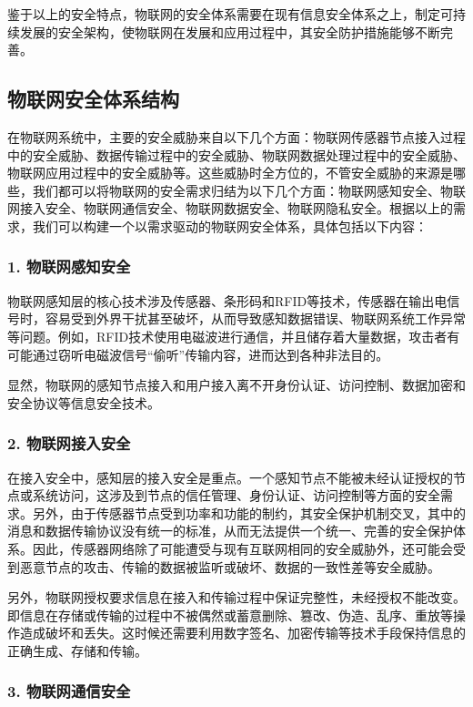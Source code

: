 鉴于以上的安全特点，物联网的安全体系需要在现有信息安全体系之上，制定可持续发展的安全架构，使物联网在发展和应用过程中，其安全防护措施能够不断完善。

\subsection{物联网安全体系结构}
\label{computer}

在物联网系统中，主要的安全威胁来自以下几个方面：物联网传感器节点接入过程中的安全威胁、数据传输过程中的安全威胁、物联网数据处理过程中的安全威胁、物联网应用过程中的安全威胁等。这些威胁时全方位的，不管安全威胁的来源是哪些，我们都可以将物联网的安全需求归结为以下几个方面：物联网感知安全、物联网接入安全、物联网通信安全、物联网数据安全、物联网隐私安全。根据以上的需求，我们可以构建一个以需求驱动的物联网安全体系，具体包括以下内容：
\subsubsection{\textcolor{myblue}{\textbf{1. 物联网感知安全 }}}

物联网感知层的核心技术涉及传感器、条形码和RFID等技术，传感器在输出电信号时，容易受到外界干扰甚至破坏，从而导致感知数据错误、物联网系统工作异常等问题。例如，RFID技术使用电磁波进行通信，并且储存着大量数据，攻击者有可能通过窃听电磁波信号“偷听”传输内容，进而达到各种非法目的。

显然，物联网的感知节点接入和用户接入离不开身份认证、访问控制、数据加密和安全协议等信息安全技术。

\subsubsection{\textcolor{myblue}{\textbf{2. 物联网接入安全 }}}

在接入安全中，感知层的接入安全是重点。一个感知节点不能被未经认证授权的节点或系统访问，这涉及到节点的信任管理、身份认证、访问控制等方面的安全需求。另外，由于传感器节点受到功率和功能的制约，其安全保护机制交叉，其中的消息和数据传输协议没有统一的标准，从而无法提供一个统一、完善的安全保护体系。因此，传感器网络除了可能遭受与现有互联网相同的安全威胁外，还可能会受到恶意节点的攻击、传输的数据被监听或破坏、数据的一致性差等安全威胁。

另外，物联网授权要求信息在接入和传输过程中保证完整性，未经授权不能改变。即信息在存储或传输的过程中不被偶然或蓄意删除、篡改、伪造、乱序、重放等操作造成破坏和丢失。这时候还需要利用数字签名、加密传输等技术手段保持信息的正确生成、存储和传输。

\subsubsection{\textcolor{myblue}{\textbf{3. 物联网通信安全 }}}

